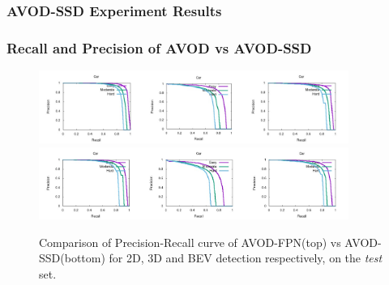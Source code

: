 \documentclass[10pt,fleqn,unknownkeysallowed]{beamer}
\begin{document}
\begin{frame}
	\frametitle{AVOD-SSD Experiment Results}
\begin{table}[h]
	\centering
	\caption{Performance analysis of \textbf{AVOD}, \textbf{AVOD-FPN} and \textbf{AVOD-SSD} on the KITTI's evaluation server.}
	\label{fig:ssd_kitti_test_result}
\end{table}
\end{frame}

\begin{frame}
   \frametitle{Recall and Precision of AVOD vs AVOD-SSD}
   \begin{figure}
   \begin{center}
   \includegraphics[width=0.9\textwidth]{images/avod_test_plots}\\
   \includegraphics[width=0.9\textwidth]{images/ssd_test_plots}
   \caption{Comparison of Precision-Recall curve of AVOD-FPN(top) vs AVOD-SSD(bottom) for 2D, 3D and BEV detection respectively, on the
      	\textit{test} set.}
   \end{center}
   \end{figure}
\end{frame}
\end{document}
